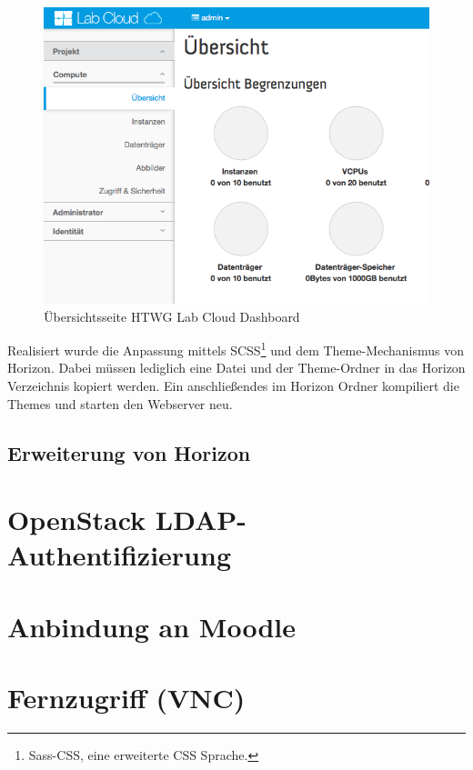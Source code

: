 \begin{figure}[htbp]
\centering
\includegraphics[scale=0.6]{img/dashboard-overview.png}
\caption{Übersichtsseite HTWG Lab Cloud Dashboard}
\label{dashboard-overview}
\end{figure}

Realisiert wurde die Anpassung mittels SCSS\footnote{Sass-CSS, eine erweiterte CSS Sprache.} und dem Theme-Mechanismus von Horizon.
Dabei müssen lediglich eine Datei und der  Theme-Ordner in das Horizon Verzeichnis kopiert werden.
Ein anschließendes  im Horizon Ordner kompiliert die Themes und starten den Webserver neu.

\subsection{Erweiterung von Horizon}

\section{OpenStack LDAP-Authentifizierung}

\section{Anbindung an Moodle}


\section{Fernzugriff (VNC)}

